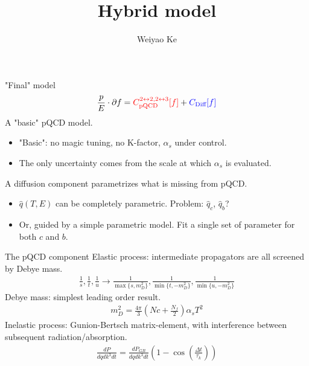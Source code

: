 \documentclass[11pt]{beamer}
\author{Weiyao Ke}
\title{Hybrid model}
\begin{document}
\begin{frame}
\titlepage
\end{frame}


\begin{frame}{"Final" model}
\begin{eqnarray}
\nonumber
\frac{p}{E}\cdot \partial f = {\color{red} C^{2\leftrightarrow 2, 2\leftrightarrow 3}_{\textrm{pQCD}}[f]} + {\color{blue} C_{\textrm{Diff}}[f]}
\end{eqnarray}
{\color{red} A "basic" pQCD model.}
\begin{itemize}
\item "Basic": no magic tuning, no K-factor, $\alpha_s$ under control.
\item The only uncertainty comes from the scale at which $\alpha_s$ is evaluated.
\end{itemize}
{\color{blue} A diffusion component parametrizes what is missing from pQCD.}
\begin{itemize}
\item $\hat{q}(T, E)$ can be completely parametric. Problem: $\hat{q}_c$, $\hat{q}_b$?
\item Or, guided by a simple parametric model. Fit a single set of parameter for both $c$ and $b$.
\end{itemize}
\end{frame}

\begin{frame}{The pQCD component}
Elastic process: intermediate propagators are all screened by Debye mass.
\begin{eqnarray}
\nonumber
\frac{1}{s}, \frac{1}{t}, \frac{1}{u} \rightarrow \frac{1}{\max\{s,m_D^2\}}, \frac{1}{\min\{t,-m_D^2\}}, \frac{1}{\min\{u,-m_D^2\}}
\end{eqnarray}
Debye mass: simplest leading order result.
\begin{eqnarray}
\nonumber
m_D^2 = \frac{4\pi}{3}\left(Nc+\frac{N_f}{2}\right)\alpha_s T^2
\end{eqnarray}
Inelastic process: Gunion-Bertsch matrix-element, with interference between subsequent radiation/absorption.
\begin{eqnarray}
\nonumber
\frac{dP}{dq dk^3 dt} = \frac{dP_{GB}}{dq dk^3 dt} \left(1-\cos\left(\frac{\Delta t}{\tau_k}\right)\right)
\end{eqnarray}
\end{frame}
\end{document}
